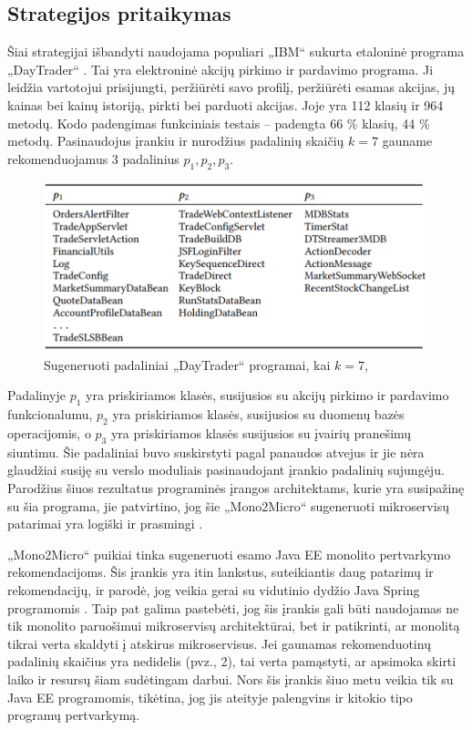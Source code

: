 \documentclass[fleqn]{VUMIFPSkursinis}
\begin{document}
\subsection{Strategijos pritaikymas}
Šiai strategijai išbandyti naudojama populiari „IBM“ sukurta etaloninė programa „DayTrader“ \cite{IBM15}. Tai yra elektroninė akcijų pirkimo ir pardavimo programa. Ji leidžia vartotojui prisijungti, peržiūrėti savo profilį, peržiūrėti esamas akcijas, jų kainas bei kainų istoriją, pirkti bei parduoti akcijas. Joje yra 112 klasių ir 964 metodų. Kodo padengimas funkciniais testais – padengta  66 \% klasių, 44 \% metodų. Pasinaudojus įrankiu ir nurodžius padalinių skaičių $k = 7$ gauname rekomenduojamus 3 padalinius $p_{1}, p_{2}, p_{3}$.

\begin{figure}[H]
    \centering
    \includegraphics{img/mono-micro-padaliniai.png}
    \caption{Sugeneruoti padaliniai „DayTrader“ programai, kai $k = 7$, \cite{KXK+21}}
    \label{img:mono-micro-padaliniai}
\end{figure}

Padalinyje $p_{1}$ yra priskiriamos klasės, susijusios su akcijų pirkimo ir pardavimo funkcionalumu, $p_{2}$ yra priskiriamos klasės, susijusios su duomenų bazės operacijomis, o $p_{3}$ yra priskiriamos klasės susijusios su įvairių pranešimų siuntimu. Šie padaliniai buvo suskirstyti pagal panaudos atvejus ir jie nėra glaudžiai susiję su verslo moduliais pasinaudojant įrankio padalinių sujungėju. Parodžius šiuos rezultatus programinės įrangos architektams, kurie yra susipažinę su šia programa, jie patvirtino, jog šie „Mono2Micro“ sugeneruoti mikroservisų patarimai yra logiški ir prasmingi \cite{KXL+20}.

„Mono2Micro“ puikiai tinka sugeneruoti esamo Java EE monolito pertvarkymo rekomendacijoms. Šis įrankis yra itin lankstus, suteikiantis daug patarimų ir rekomendacijų, ir parodė, jog veikia gerai su vidutinio dydžio Java Spring programomis \cite{San21}. Taip pat galima pastebėti, jog šis įrankis gali būti naudojamas ne tik monolito paruošimui mikroservisų architektūrai, bet ir patikrinti, ar monolitą tikrai verta skaldyti į atskirus mikroservisus. Jei gaunamas rekomenduotinų padalinių skaičius yra nedidelis (pvz., 2), tai verta pamąstyti, ar apsimoka skirti laiko ir resursų šiam sudėtingam darbui. Nors šis įrankis šiuo metu veikia tik su Java EE programomis, tikėtina, jog jis ateityje palengvins ir kitokio tipo programų pertvarkymą.
\end{document}
